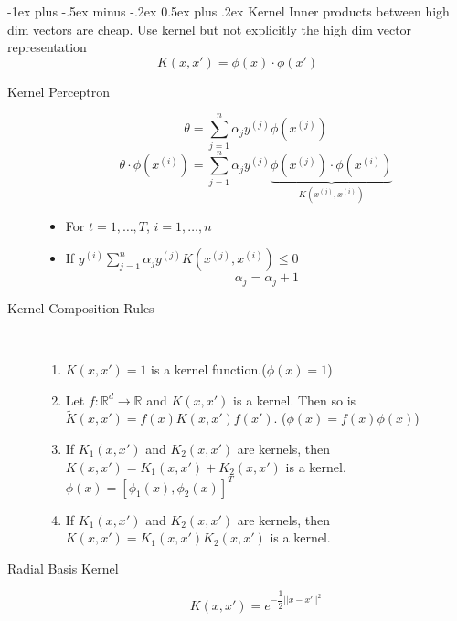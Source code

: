 \documentclass[a4paper, 10pt,landscape]{article}
\makeatletter
\renewcommand{\section}{\@startsection{section}{1}{0mm}%
                                {-1ex plus -.5ex minus -.2ex}%
                                {0.5ex plus .2ex}%
                                {\normalfont\large\bfseries}}
\makeatother
\begin{document}
\begin{multicols*}{3}
\section{Kernel}
Inner products between high dim vectors are cheap. Use kernel but not explicitly the high dim vector representation
$$K\left(x,x'\right)=\phi(x)\cdot\phi(x')$$
\begin{description}
	\item[Kernel Perceptron]
		$$\theta=\sum_{j=1}^{n}\alpha_jy^{(j)}\phi\left(x^{(j)}\right)$$
		$$\theta\cdot\phi\left(x^{(i)}\right)=\sum_{j=1}^{n}\alpha_jy^{(j)}\underbrace{\phi\left(x^{(j)}\right)\cdot\phi\left(x^{(i)}\right)}_{K\left(x^{(j)},x^{(i)}\right)}$$
		\begin{itemize}
			\item   For  {$t=1,\dots,T$}, {$i=1,\dots,n$}
			\item If {$y^{(i)}\sum\limits_{j=1}^{n}\alpha_jy^{(j)}K\left(x^{(j)},x^{(i)}\right)\leq0$}
						$$\alpha_j=\alpha_j+1$$
		\end{itemize}
	\item[Kernel Composition Rules]~
		\begin{enumerate}
			\item $K(x,x')=1$ is a kernel function.($\phi(x)=1$)
			\item Let $f:\mathbb{R}^d\rightarrow\mathbb{R}$ and $K(x,x')$ is a kernel. Then so is $\widetilde{K}(x,x')=f(x)K(x,x')f(x').$  ($\phi(x) = f(x)\phi(x)$)
			\item If $K_1(x,x')$ and $K_2(x,x')$ are kernels, then $K(x,x')=K_1(x,x')+K_2(x,x')$ is a kernel. $\phi(x) = [\phi_1(x), \phi_2(x)]^T$
			\item If $K_1(x,x')$ and $K_2(x,x')$ are kernels, then $K(x,x')=K_1(x,x')K_2(x,x')$ is a kernel.
		\end{enumerate}
	\item[Radial Basis Kernel]
		$$K(x, x') = e^{-\dfrac{1}{2}||x-x'||^2}$$
\end{description}





\end{multicols*}
\end{document}
